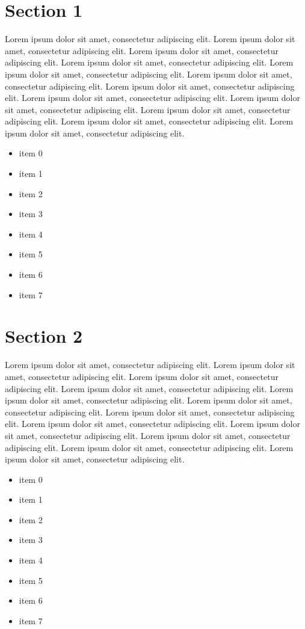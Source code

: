 \documentclass{article}
\begin{document}
\section{Section 1}
Lorem ipsum dolor sit amet, consectetur adipiscing elit. Lorem ipsum dolor sit amet, consectetur adipiscing elit. Lorem ipsum dolor sit amet, consectetur adipiscing elit. Lorem ipsum dolor sit amet, consectetur adipiscing elit. Lorem ipsum dolor sit amet, consectetur adipiscing elit. Lorem ipsum dolor sit amet, consectetur adipiscing elit. Lorem ipsum dolor sit amet, consectetur adipiscing elit. Lorem ipsum dolor sit amet, consectetur adipiscing elit. Lorem ipsum dolor sit amet, consectetur adipiscing elit. Lorem ipsum dolor sit amet, consectetur adipiscing elit. Lorem ipsum dolor sit amet, consectetur adipiscing elit. Lorem ipsum dolor sit amet, consectetur adipiscing elit. 
\begin{itemize}
\item item 0
\item item 1
\item item 2
\item item 3
\item item 4
\item item 5
\item item 6
\item item 7
\end{itemize}

\section{Section 2}
Lorem ipsum dolor sit amet, consectetur adipiscing elit. Lorem ipsum dolor sit amet, consectetur adipiscing elit. Lorem ipsum dolor sit amet, consectetur adipiscing elit. Lorem ipsum dolor sit amet, consectetur adipiscing elit. Lorem ipsum dolor sit amet, consectetur adipiscing elit. Lorem ipsum dolor sit amet, consectetur adipiscing elit. Lorem ipsum dolor sit amet, consectetur adipiscing elit. Lorem ipsum dolor sit amet, consectetur adipiscing elit. Lorem ipsum dolor sit amet, consectetur adipiscing elit. Lorem ipsum dolor sit amet, consectetur adipiscing elit. Lorem ipsum dolor sit amet, consectetur adipiscing elit. Lorem ipsum dolor sit amet, consectetur adipiscing elit. 
\begin{itemize}
\item item 0
\item item 1
\item item 2
\item item 3
\item item 4
\item item 5
\item item 6
\item item 7
\end{itemize}
\end{document}
